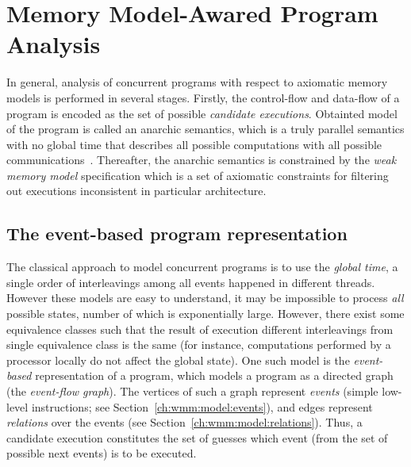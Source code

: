 \chapter{Memory Model-Awared Program Analysis}
\label{ch:wmm}

In general, analysis of concurrent programs with respect to axiomatic memory models is performed in several stages. Firstly, the control-flow and data-flow of a program is encoded as the set of possible \textit{candidate executions}. %
Obtainted model of the program is called an anarchic semantics, which is a truly parallel semantics with no global time that describes all possible computations with all possible communications~\cite{alglave2016syntax}. Thereafter, the anarchic semantics is constrained by the \textit{weak memory model} specification which is a set of axiomatic constraints for filtering out executions inconsistent in particular architecture.


\section{The event-based program representation}
\label{ch:wmm:event}


The classical approach to model concurrent programs is to use the \textit{global time}, a single order of interleavings among all events happened in different threads. However these models are easy to understand, it may be impossible to process \textit{all} possible states, number of which is exponentially large. However, there exist some equivalence classes such that the result of execution different interleavings from single equivalence class is the same (for instance, computations performed by a processor locally do not affect the global state).
One such model is the \textit{event-based} representation of a program, which models a program as a directed graph (the \textit{event-flow graph}). The vertices of such a graph represent \textit{events} (simple low-level instructions; see Section~\ref{ch:wmm:model:events}), and edges represent \textit{relations} over the events (see Section~\ref{ch:wmm:model:relations}). Thus, a candidate execution constitutes the set of guesses which event (from the set of possible next events) is to be executed. 


